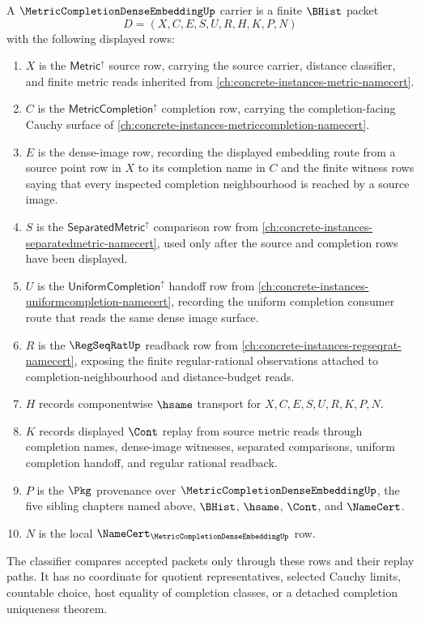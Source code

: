 \begin{definition}
\label{def:metric-completion-dense-embedding-carrier}
A $\MetricCompletionDenseEmbeddingUp$ carrier is a finite $\BHist$ packet
$$
D=(X,C,E,S,U,R,H,K,P,N)
$$
with the following displayed rows:
\begin{enumerate}
\item $X$ is the $\mathsf{Metric}^{\uparrow}$ source row, carrying the source carrier, distance classifier, and finite metric reads inherited from \autoref{ch:concrete-instances-metric-namecert}.
\item $C$ is the $\mathsf{MetricCompletion}^{\uparrow}$ completion row, carrying the completion-facing Cauchy surface of \autoref{ch:concrete-instances-metriccompletion-namecert}.
\item $E$ is the dense-image row, recording the displayed embedding route from a source point row in $X$ to its completion name in $C$ and the finite witness rows saying that every inspected completion neighbourhood is reached by a source image.
\item $S$ is the $\mathsf{SeparatedMetric}^{\uparrow}$ comparison row from \autoref{ch:concrete-instances-separatedmetric-namecert}, used only after the source and completion rows have been displayed.
\item $U$ is the $\mathsf{UniformCompletion}^{\uparrow}$ handoff row from \autoref{ch:concrete-instances-uniformcompletion-namecert}, recording the uniform completion consumer route that reads the same dense image surface.
\item $R$ is the $\RegSeqRatUp$ readback row from \autoref{ch:concrete-instances-regseqrat-namecert}, exposing the finite regular-rational observations attached to completion-neighbourhood and distance-budget reads.
\item $H$ records componentwise $\hsame$ transport for $X,C,E,S,U,R,K,P,N$.
\item $K$ records displayed $\Cont$ replay from source metric reads through completion names, dense-image witnesses, separated comparisons, uniform completion handoff, and regular rational readback.
\item $P$ is the $\Pkg$ provenance over $\MetricCompletionDenseEmbeddingUp$, the five sibling chapters named above, $\BHist$, $\hsame$, $\Cont$, and $\NameCert$.
\item $N$ is the local $\NameCert_{\MetricCompletionDenseEmbeddingUp}$ row.
\end{enumerate}
The classifier compares accepted packets only through these rows and their replay paths. It has no coordinate for quotient representatives, selected Cauchy limits, countable choice, host equality of completion classes, or a detached completion uniqueness theorem.
\end{definition}

